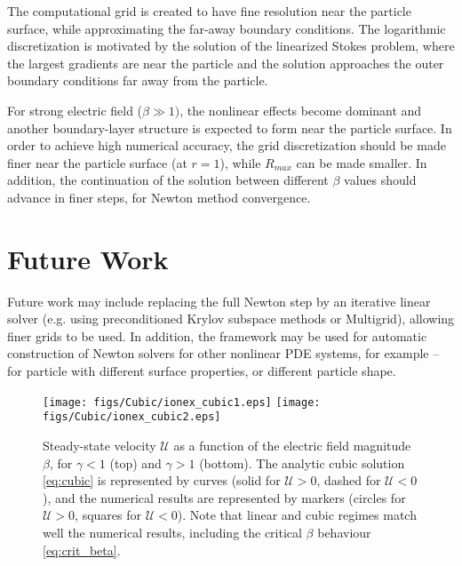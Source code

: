 \documentclass[MSc,beforeExam]{iitcsthesis}
\newcommand\cU{\mathscr{U}}
\begin{document}
The computational grid is created to have fine resolution near the particle surface, while
approximating the far-away boundary conditions. The logarithmic discretization is motivated
by the solution of the linearized Stokes problem, where the largest gradients are near the particle
and the solution approaches the outer boundary conditions far away from the particle.

For strong electric field ($\beta \gg 1)$, the nonlinear effects become dominant and
another boundary-layer structure is expected to form near the particle surface. 
In order to achieve high numerical accuracy, the grid discretization should be made finer
near the particle surface (at $r = 1$), while $R_{max}$ can be made smaller.
In addition, the continuation of the solution between different $\beta$ values
should advance in finer steps, for Newton method convergence.

\section{Future Work}
Future work may include replacing the full Newton step by an iterative linear solver
(e.g. using preconditioned Krylov subspace methods \cite{saad2003book} or
Multigrid), allowing finer grids to be used.
In addition, the framework may be used for automatic construction of Newton solvers 
for other nonlinear PDE systems, for example -- for particle with different surface 
properties, or different particle shape.

\begin{figure}
    \begin{center}
    \texttt{[image: figs/Cubic/ionex\_cubic1.eps]}
    \texttt{[image: figs/Cubic/ionex\_cubic2.eps]}
        \caption[Ion exchanger steady-state velocity]{
        Steady-state velocity $\cU$ as a function of the 
        electric field magnitude $\beta$, for $\gamma < 1$ (top) and $\gamma > 1$ (bottom). 
        The analytic cubic solution \eqref{eq:cubic} is represented by curves
        (solid for $\cU > 0$, dashed for $\cU < 0$), 
        and the numerical results are represented by markers 
        (circles for $\cU > 0$, squares for $\cU < 0$). Note that linear and
        cubic regimes match well the numerical results, including the critical $\beta$ 
        behaviour \eqref{eq:crit_beta}. 
        }
	    \label{fig:IonExCubic}
    \end{center}
\end{figure}
\end{document}
